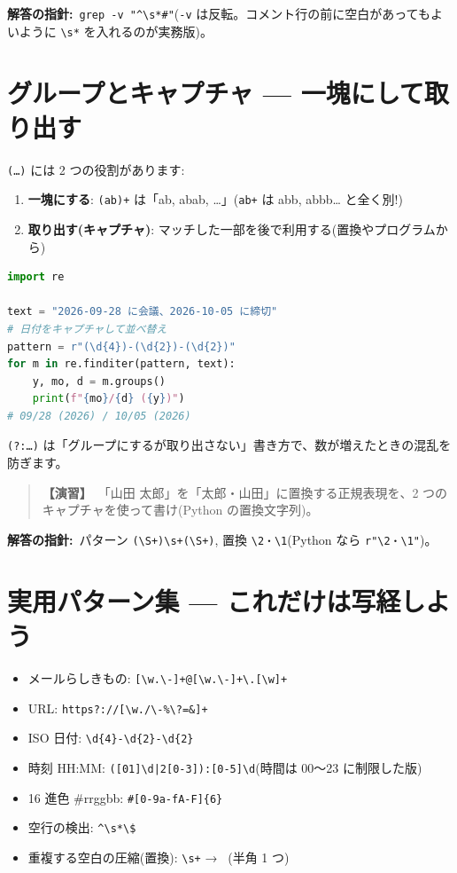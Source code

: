 \documentclass{article}
\begin{document}
\textbf{解答の指針:}\ \texttt{grep -v "\textasciicircum\textbackslash s*\#"}(\texttt{-v} は反転。コメント行の前に空白があってもよいように \texttt{\textbackslash s*} を入れるのが実務版)。

\section{グループとキャプチャ — 一塊にして取り出す}

\texttt{(…)} には 2 つの役割があります:
\begin{enumerate}
\item \textbf{一塊にする}: \texttt{(ab)+} は「ab, abab, …」(\texttt{ab+} は abb, abbb… と全く別!)
\item \textbf{取り出す(キャプチャ)}: マッチした一部を後で利用する(置換やプログラムから)
\end{enumerate}

\begin{lstlisting}[language=Python]
import re

text = "2026-09-28 に会議、2026-10-05 に締切"
# 日付をキャプチャして並べ替え
pattern = r"(\d{4})-(\d{2})-(\d{2})"
for m in re.finditer(pattern, text):
    y, mo, d = m.groups()
    print(f"{mo}/{d} ({y})")
# 09/28 (2026) / 10/05 (2026)
\end{lstlisting}

\texttt{(?:…)} は「グループにするが取り出さない」書き方で、数が増えたときの混乱を防ぎます。

\begin{quote}
\textbf{【演習】}\ 「山田 太郎」を「太郎・山田」に置換する正規表現を、2 つのキャプチャを使って書け(Python の置換文字列)。
\end{quote}

\textbf{解答の指針:}\ パターン \texttt{(\textbackslash S+)\textbackslash s+(\textbackslash S+)}, 置換 \texttt{\textbackslash 2・\textbackslash 1}(Python なら \texttt{r"\textbackslash 2・\textbackslash 1"})。

\section{実用パターン集 — これだけは写経しよう}

\begin{itemize}
\item メールらしきもの: \texttt{[\textbackslash w.\textbackslash -]+@[\textbackslash w.\textbackslash -]+\textbackslash .[\textbackslash w]+}
\item URL: \texttt{https?://[\textbackslash w./\textbackslash -\%\textbackslash ?=\&]+}
\item ISO 日付: \texttt{\textbackslash d\{4\}-\textbackslash d\{2\}-\textbackslash d\{2\}}
\item 時刻 HH:MM: \texttt{([01]\textbackslash d|2[0-3]):[0-5]\textbackslash d}(時間は 00〜23 に制限した版)
\item 16 進色 \#rrggbb: \texttt{\#[0-9a-fA-F]\{6\}}
\item 空行の検出: \texttt{\textasciicircum\textbackslash s*\textbackslash \$}
\item 重複する空白の圧縮(置換): \texttt{\textbackslash s+} → \texttt{ }(半角 1 つ)
\end{itemize}
\end{document}
